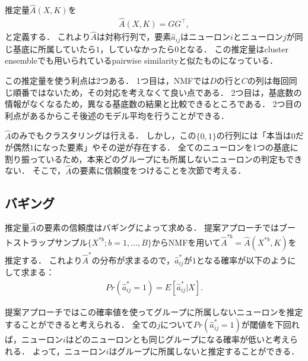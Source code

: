 推定量$\hat{A}(X,K)$を
\begin{align}
	\hat{A}(X,K) = G G^{\top},
\end{align}
と定義する．
これより$\hat{A}$は対称行列で，要素$\hat{a}_{ij}$はニューロン$i$とニューロン$j$が同じ基底に所属していたら$1$，していなかったら$0$となる．
この推定量はcluster ensembleでも用いられているpairwise similarity\cite{Boongoen2018}と似たものになっている．

この推定量を使う利点は2つある．
1つ目は，NMFでは$D$の行と$C$の列は毎回同じ順番ではないため，その対応を考えなくて良い点である．
2つ目は，基底数の情報がなくなるため，異なる基底数の結果と比較できるところである．
2つ目の利点があるからこそ後述のモデル平均を行うことができる．

$\hat{A}$のみでもクラスタリングは行える．
しかし，この$\{0,1\}$の行列には「本当は$0$だが偶然$1$になった要素」やその逆が存在する．
全てのニューロンを1つの基底に割り振っているため，本来どのグループにも所属しないニューロンの判定もできない．
そこで，$\hat{A}$の要素に信頼度をつけることを次節で考える．

\subsection{バギング}
推定量$\hat{A}$の要素の信頼度はバギングによって求める．
提案アプローチではブートストラップサンプル$\{X^{*b}; b = 1, \dots, B\}$からNMFを用いて$\hat{A}^{*b} = \hat{A}(X^{*b},K)$を推定する．
これより$\hat{A}^*$の分布が求まるので，$\hat{a}^*_{ij}$が$1$となる確率が以下のようにして求まる：
\begin{align}
	Pr(\hat{a}^*_{ij} = 1) = E[\hat{a}^*_{ij}|X].
\end{align}

提案アプローチではこの確率値を使ってグループに所属しないニューロンを推定することができると考えられる．
全ての$j$について$Pr(\hat{a}^*_{ij} = 1)$が閾値を下回れば，ニューロン$i$はどのニューロンとも同じグループになる確率が低いと考えられる．
よって，ニューロン$i$はグループに所属しないと推定することができる．


